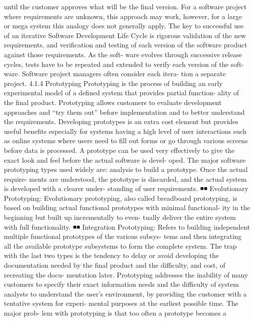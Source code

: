 \documentclass[a4paper,12pt]{book}
\begin{document}
until the customer approves what will be the final version.
For a software project where requirements are unknown, this
approach may work, however, for a large or mega system this
analogy does not generally apply.
The key to successful use of an iterative Software
Development Life Cycle is rigorous validation of the new
requirements, and verification and testing of each version of
the software product against those requirements. As the soft-
ware evolves through successive release cycles, tests have to
be repeated and extended to verify each version of the soft-
ware. Software project managers often consider each itera-
tion a separate project.
4.1.4 Prototyping
Prototyping is the process of building an early experimental
model of a defined system that provides partial function-
ality of the final product. Prototyping allows customers to
evaluate development approaches and “try them out” before
implementation and to better understand the requirements.
Developing prototypes is an extra cost element but provides
useful benefits especially for systems having a high level of
user interactions such as online systems where users need to
fill out forms or go through various screens before data is
processed. A prototype can be used very effectively to give
the exact look and feel before the actual software is devel-
oped. The major software prototyping types used widely are:
analysis to build a prototype. Once the actual require-
ments are understood, the prototype is discarded, and
the actual system is developed with a clearer under-
standing of user requirements.
◾◾ Evolutionary Prototyping: Evolutionary prototyping,
also called breadboard prototyping, is based on building
actual functional prototypes with minimal functional-
ity in the beginning but built up incrementally to even-
tually deliver the entire system with full functionality.
◾◾ Integration Prototyping: Refers to building independent
multiple functional prototypes of the various subsys-
tems and then integrating all the available prototype
subsystems to form the complete system.
The trap with the last two types is the tendency to delay
or avoid developing the documentation needed by the final
product and the difficulty, and cost, of recreating the docu-
mentation later.
Prototyping addresses the inability of many customers
to specify their exact information needs and the difficulty
of system analysts to understand the user’s environment, by
providing the customer with a tentative system for experi-
mental purposes at the earliest possible time. The major prob-
lem with prototyping is that too often a prototype becomes a
\end{document}
